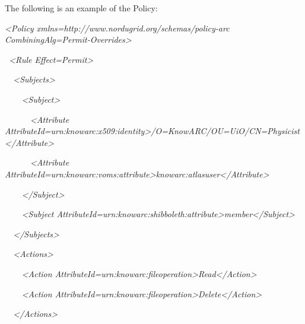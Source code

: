 \documentclass{article}
\begin{document}
{\color{black}
The following is an example of the Policy:}

{\itshape\color{black}
{\textless}Policy
xmlns={\textquotedbl}http://www.nordugrid.org/schemas/policy-arc{\textquotedbl}
CombiningAlg={\textquotedbl}Permit-Overrides{\textquotedbl}{\textgreater}}

{\color{black}
\textit{\ }\textit{{\textless}Rule
Effect={\textquotedbl}Permit{\textquotedbl}{\textgreater}}}

{\color{black}
\textit{\ \ }\textit{{\textless}Subjects{\textgreater}}}

{\color{black}
\textit{\ \ \ \ }\textit{{\textless}Subject{\textgreater}}}

{\color{black}
\textit{\ \ \ \ \ \ }\textit{{\textless}Attribute
AttributeId={\textquotedbl}urn:knowarc:x509:identity{\textquotedbl}{\textgreater}/O=KnowARC/OU=UiO/CN=Physicist{\textless}/Attribute{\textgreater}}}

{\color{black}
\textit{\ \ \ \ \ \ }\textit{{\textless}Attribute
AttributeId={\textquotedbl}urn:knowarc:voms:attribute{\textgreater}knowarc:atlasuser{\textless}/Attribute{\textgreater}}}

{\color{black}
\textit{\ \ \ \ }\textit{{\textless}/Subject{\textgreater}}}

{\color{black}
\textit{\ \ \ \ }\textit{{\textless}Subject
AttributeId={\textquotedbl}urn:knowarc:shibboleth:attribute{\textquotedbl}{\textgreater}member{\textless}/Subject{\textgreater}}}

{\color{black}
\textit{\ \ }\textit{{\textless}/Subjects{\textgreater}}}

{\color{black}
\textit{\ \ }\textit{{\textless}Actions{\textgreater}}}

{\color{black}
\textit{\ \ \ \ }\textit{{\textless}Action
AttributeId={\textquotedbl}urn:knowarc:fileoperation{\textquotedbl}{\textgreater}Read{\textless}/Action{\textgreater}}}

{\color{black}
\textit{\ \ \ \ }\textit{{\textless}Action
AttributeId={\textquotedbl}urn:knowarc:fileoperation{\textquotedbl}{\textgreater}Delete{\textless}/Action{\textgreater}
\ \ }}

{\color{black}
\textit{\ \ }\textit{{\textless}/Actions{\textgreater}}}
\end{document}
